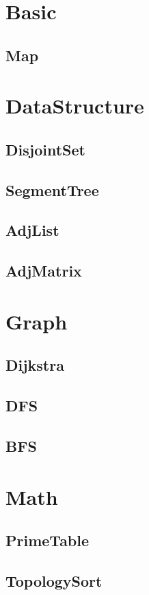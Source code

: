 \section{Basic}
\subsection{Map}


\section{DataStructure}
\subsection{DisjointSet}

\subsection{SegmentTree}

\subsection{AdjList}

\subsection{AdjMatrix}


\section{Graph}
\subsection{Dijkstra}

\subsection{DFS}

\subsection{BFS}


\section{Math}
\subsection{PrimeTable}

\subsection{TopologySort}







